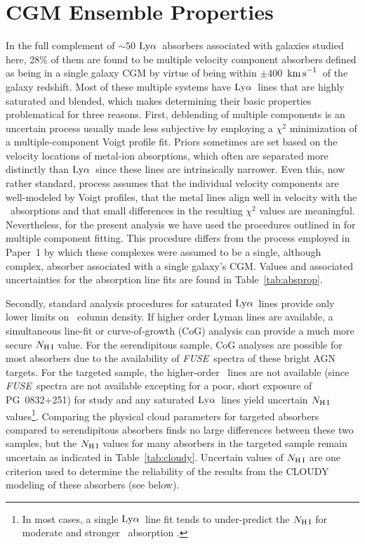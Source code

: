 \documentclass[twocolumn,twocolappendix,tighten,times]{aastex6}
\newcommand{\HI}{\ion{H}{1}}
\newcommand{\fuse}{{\sl FUSE}}
\newcommand{\kms}{\ensuremath{{\rm km\,s}^{-1}}}
\newcommand{\lya}{\ensuremath{{\rm Ly}\alpha}}
\begin{document}
\section{CGM Ensemble Properties}
\label{ensemble}

In the full complement of $\sim50$ \lya\ absorbers associated with galaxies 
studied here, 28\% of them are found to be multiple velocity component 
absorbers defined as being in a single galaxy CGM by virtue of being within 
$\pm400$~\kms\ of the galaxy redshift. Most of these multiple systems have 
\lya\ lines that are highly saturated and blended, which makes determining their 
basic properties problematical for three reasons. First, deblending of multiple 
components is an uncertain process usually made less subjective by employing a 
$\chi^2$ minimization of a multiple-component Voigt profile fit. Priors sometimes 
are set based on the velocity locations of metal-ion absorptions, which often 
are separated more distinctly than \lya\ since these lines are intrinsically 
narrower. Even this, now rather standard, process 
\citep[e.g.,][]{werk12,savage14, danforth16} assumes that the individual velocity 
components are well-modeled by Voigt profiles, that the metal lines align well in 
velocity with the \HI\ absorptions and that small differences in the resulting 
$\chi^2$ values are meaningful. Nevertheless, for the present analysis we have 
used the procedures outlined in \citet{danforth16} for multiple component fitting. 
This procedure differs from the process employed in Paper~1 by which these 
complexes were assumed to be a single, although complex, absorber associated with 
a single galaxy's CGM. Values and associated uncertainties for the absorption 
line fits are found in Table~\ref{tab:absprop}. 

Secondly, standard analysis procedures for saturated \lya\ lines
\citep[e.g., apparent optical depth;][]{savage91} provide only lower limits 
on \HI\ column density. If higher order Lyman lines are available, a simultaneous
line-fit or curve-of-growth (CoG) analysis can provide a much more secure 
$N_{\rm H\,I}$ value. For the serendipitous sample, CoG analyses are possible for 
most absorbers due to the availability of \fuse\ spectra of these bright AGN 
targets. For the targeted sample, the higher-order \HI\ lines are not available 
(since \fuse\ spectra are not available excepting for a poor, short exposure of 
PG~0832+251) for study and any saturated \lya\ lines yield uncertain 
$N_{\rm H\,I}$ values\footnote{In most cases, a single \lya\ line fit tends to 
under-predict the $N_{\rm H\,I}$ for moderate and stronger \HI\ absorption 
\citep[$\log{N_{\rm H\,I}} \ga 13.5$;][]{danforth10}.}. 
Comparing the physical cloud parameters for targeted absorbers compared to 
serendipitous absorbers finds no large differences between these two samples, but 
the $N_{\rm H\,I}$ values for many absorbers in the targeted sample remain 
uncertain as indicated in Table~\ref{tab:cloudy}. Uncertain values of 
$N_{\rm H\,I}$ are one criterion used to determine the reliability of the results 
from the CLOUDY modeling of these absorbers (see below).     
\end{document}
